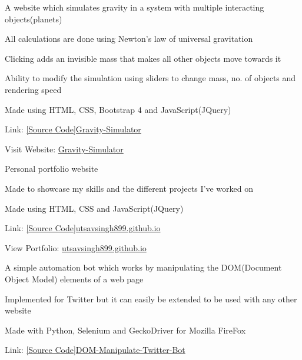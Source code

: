 \documentclass[]{deedy-resume-openfont}
\begin{document}
\begin{minipage}[t]{0.66\textwidth}
\begin{tightemize}
\item A website which simulates gravity in a system with multiple interacting objects(planets)
\item All calculations are done using Newton's law of universal gravitation
\item Clicking adds an invisible mass that makes all other objects move towards it
\item Ability to modify the simulation using sliders to change mass, no. of objects and rendering speed
\item Made using HTML, CSS, Bootstrap 4 and JavaScript(JQuery)
\item Link: \href{https://github.com/utsavsingh899/Gravity-Simulator}{[Source Code]Gravity-Simulator}
\item Visit Website: \href{https://utsavsingh899.github.io/Gravity-Simulator/}{Gravity-Simulator}
\end{tightemize}
\sectionsep

\begin{tightemize}
\item Personal portfolio website
\item Made to showcase my skills and the different projects I've worked on
\item Made using HTML, CSS and JavaScript(JQuery)
\item Link: \href{https://github.com/utsavsingh899/utsavsingh899.github.io}{[Source Code]utsavsingh899.github.io}
\item View Portfolio: \href{https://utsavsingh899.github.io/}{utsavsingh899.github.io}
\end{tightemize}
\sectionsep

\begin{tightemize}
\item A simple automation bot which works by manipulating the DOM(Document Object Model) elements of a web page
\item Implemented for Twitter but it can easily be extended to be used with any other website
\item Made with Python, Selenium and GeckoDriver for Mozilla FireFox
\item Link: \href{https://github.com/utsavsingh899/DOM-Manipulate-Twitter-Bot}{[Source Code]DOM-Manipulate-Twitter-Bot}
\end{tightemize}
\sectionsep


\end{minipage}
\end{document}
